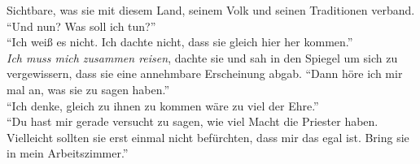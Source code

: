 Sichtbare, was sie mit diesem Land, seinem Volk und seinen Traditionen verband. ``Und nun? Was 
soll ich tun?''\\
``Ich weiß es nicht. Ich dachte nicht, dass sie gleich hier her kommen.''\\
\textit{Ich muss mich zusammen reisen}, dachte sie und sah in den Spiegel um sich zu 
vergewissern, dass sie eine annehmbare Erscheinung abgab. ``Dann höre ich mir mal an, was sie zu 
sagen haben.''\\
``Ich denke, gleich zu ihnen zu kommen wäre zu viel der Ehre.''\\
``Du hast mir gerade versucht zu sagen, wie viel Macht die Priester haben. Vielleicht sollten sie 
erst einmal nicht befürchten, dass mir das egal ist. Bring sie in mein Arbeitszimmer.''\\


